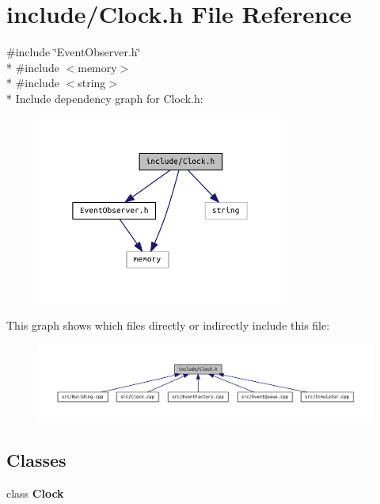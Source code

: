 \section{include/\+Clock.h File Reference}
\label{_clock_8h}
{\ttfamily \#include \char`\"{}Event\+Observer.\+h\char`\"{}}\\*
{\ttfamily \#include $<$memory$>$}\\*
{\ttfamily \#include $<$string$>$}\\*
Include dependency graph for Clock.\+h\+:\nopagebreak
\begin{figure}[H]
\begin{center}
\leavevmode
\includegraphics[width=232pt]{_clock_8h__incl}
\end{center}
\end{figure}
This graph shows which files directly or indirectly include this file\+:\nopagebreak
\begin{figure}[H]
\begin{center}
\leavevmode
\includegraphics[width=350pt]{_clock_8h__dep__incl}
\end{center}
\end{figure}
\subsection*{Classes}
\begin{DoxyCompactItemize}
\item 
class {\bf Clock}
\end{DoxyCompactItemize}
